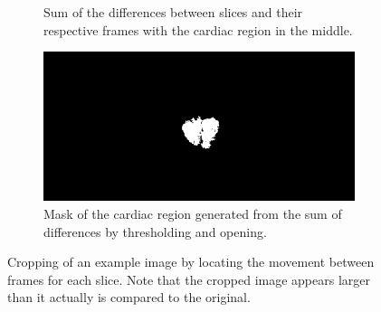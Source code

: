 \documentclass[english,version-2022-01]{uzl-thesis} %
\begin{document}
\begin{figure}[h]
\begin{subfigure}{0.4\textwidth}
    		\caption{Sum of the differences between slices and their respective frames with the cardiac region in the middle.}
    		\label{fig:SumDifferences}
	\end{subfigure}
	\hfill
	\begin{subfigure}{0.4\textwidth}
    		\includegraphics[width=\textwidth]{MaskForCropping.png}
    		\caption{Mask of the cardiac region generated from the sum of differences by thresholding and opening.}
    		\label{fig:MaskCropping}
	\end{subfigure}
	\caption{Cropping of an example image by locating the movement between frames for each slice. Note that the cropped image appears larger than it actually is compared to the original.}
	\label{fig:ImageCropping}
\end{figure}

\end{document}
